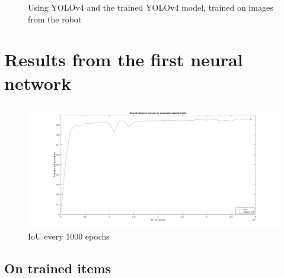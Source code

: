 \begin{figure}[h]
    \hfill
    \caption{Using YOLOv4 and the trained YOLOv4 model, trained on images from the robot}
    \label{figure: beforeaftertraining}
\end{figure}

\clearpage
\section{Results from the first neural network}
\begin{figure}[h]
    \centering
    \includegraphics[width=1\textwidth]{graphics/results/neuralnetworkauto.png}
    \caption{IoU every 1000 epochs}
    \label{fig:neuralnetwork}
\end{figure}

\subsection{On trained items}

